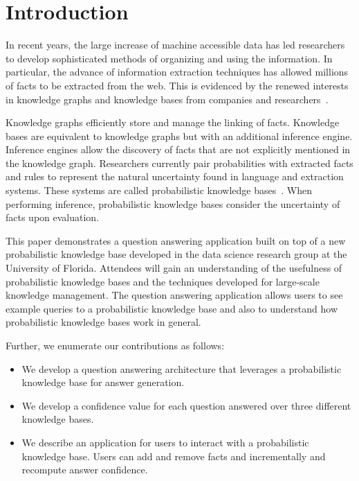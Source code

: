 

\section{Introduction}


In recent years, the large increase of machine accessible data has led researchers
to develop sophisticated methods of organizing and using the information.
In particular, the advance of information extraction techniques has allowed
millions of facts to be extracted from the web.
This is evidenced by the renewed interests in knowledge graphs and knowledge bases
from companies and
researchers~\cite{bellare2013woo,chang2014typed,dong2014knowledge,niu2012deepdive}.

Knowledge graphs efficiently store and manage the linking of facts.
Knowledge bases are equivalent to knowledge graphs but with an additional
inference engine. 
Inference engines allow the discovery of facts that are not explicitly
mentioned in the knowledge graph.
Researchers currently pair probabilities with extracted facts and rules to
represent the natural uncertainty found in language and extraction systems.
These systems are called probabilistic knowledge bases~\cite{chen2014knowledge}.
When performing inference, probabilistic knowledge bases consider the uncertainty
of facts upon evaluation.

This paper demonstrates a question answering application built on top of
a new probabilistic knowledge base developed in the data science research group at the University of Florida.
Attendees will gain an understanding of the usefulness of probabilistic
knowledge bases and the techniques developed for large-scale knowledge
management.
The question answering application allows users to see example queries to a
probabilistic knowledge base and also to understand how probabilistic knowledge bases work in general.

Further, we enumerate our contributions as follows:
\begin{itemize}[noitemsep,topsep=2pt,parsep=2pt,partopsep=0pt,
                leftmargin=10pt,labelindent=0pt,itemindent=0pt]
\item We develop a question answering architecture that leverages a probabilistic knowledge base for answer generation.

\item We develop a confidence value for each question answered over three
  different knowledge bases.

\item We describe an application for users to interact with a probabilistic knowledge base.
Users can add and remove facts and incrementally and recompute answer confidence.
\end{itemize}

